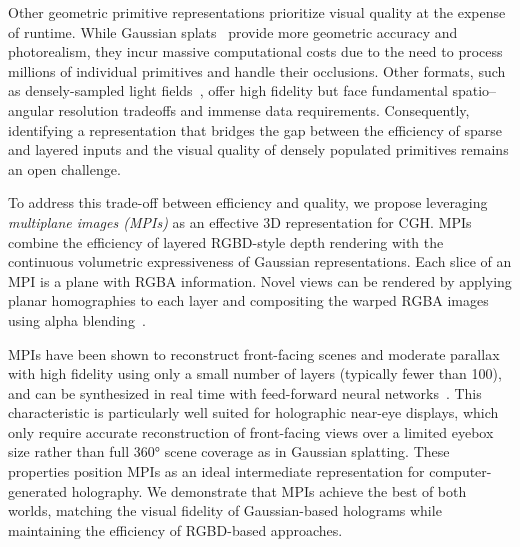 Other geometric primitive representations prioritize visual quality at the expense of runtime. While Gaussian splats~\cite{choi2025gaussian, chao2025rpws} provide more geometric accuracy and photorealism, they incur massive computational costs due to the need to process millions of individual primitives and handle their occlusions. Other formats, such as densely-sampled light fields~\cite{schiffers2023stochastic, choi2022time, kim2024holographic}, offer high fidelity but face fundamental spatio–angular resolution tradeoffs and immense data requirements. Consequently, identifying a representation that bridges the gap between the efficiency of sparse and layered inputs and the visual quality of densely populated primitives remains an open challenge.

To address this trade-off between efficiency and quality, we propose leveraging \textit{multiplane images (MPIs)} as an effective 3D representation for CGH. MPIs combine the efficiency of layered RGBD-style depth rendering with the continuous volumetric expressiveness of Gaussian representations. Each slice of an MPI is a plane with RGBA information. Novel views can be rendered by applying planar homographies to each layer and compositing the warped RGBA images using alpha blending~\cite{zhou2018mpi}.

MPIs have been shown to reconstruct front-facing scenes and moderate parallax with high fidelity using only a small number of layers (typically fewer than 100), and can be synthesized in real time with feed-forward neural networks~\cite{pu2023sinmpi, khan2023tiledmpi, han2022adaptivempi, tucker2020singlempi, flynn2019deepviewmpi, zhao2022generativempi, luvizon2021adaptivempi, srinivasan2019pushingmpi, zhou2018mpi}. This characteristic is particularly well suited for holographic near-eye displays, which only require accurate reconstruction of front-facing views over a limited eyebox size rather than full 360° scene coverage as in Gaussian splatting. These properties position MPIs as an ideal intermediate representation for computer-generated holography. We demonstrate that MPIs achieve the best of both worlds, matching the visual fidelity of Gaussian-based holograms while maintaining the efficiency of RGBD-based approaches.

